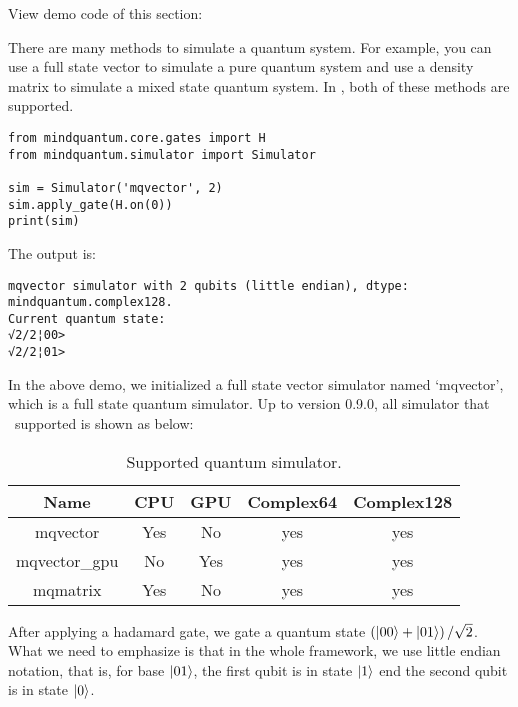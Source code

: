 
View demo code of this section: 

There are many methods to simulate a quantum system. For example, you can use a full state vector to simulate a pure quantum system and use a density matrix to simulate a mixed state quantum system. In \MindQuantum, both of these methods are supported.

\begin{lstlisting}
from mindquantum.core.gates import H
from mindquantum.simulator import Simulator

sim = Simulator('mqvector', 2)
sim.apply_gate(H.on(0))
print(sim)
\end{lstlisting}
The output is:

\begin{lstlisting}
mqvector simulator with 2 qubits (little endian), dtype: mindquantum.complex128.
Current quantum state:
√2/2¦00>
√2/2¦01>
\end{lstlisting}

In the above demo, we initialized a full state vector simulator named `mqvector', which is a full state quantum simulator. Up to version 0.9.0, all simulator that \MindQuantum\ supported is shown as below:
\begin{table}[ht]
    \begin{tabular}{ccccc}
        \toprule
        Name          & CPU & GPU & Complex64 & Complex128 \\
        \midrule
        mqvector      & Yes & No  & yes       & yes        \\
        mqvector\_gpu & No  & Yes & yes       & yes        \\
        mqmatrix      & Yes & No  & yes       & yes        \\
        \bottomrule
    \end{tabular}
    \caption{Supported quantum simulator.}
    \label{tab:simulator_supported}
\end{table}
After applying a hadamard gate, we gate a quantum state $\left(\ket{00}+\ket{01}\right)/\sqrt{2}$. What we need to emphasize is that in the whole framework, we use little endian notation, that is, for base $\ket{01}$, the first qubit is in state $\ket{1}$ end the second qubit is in state $\ket{0}$.

